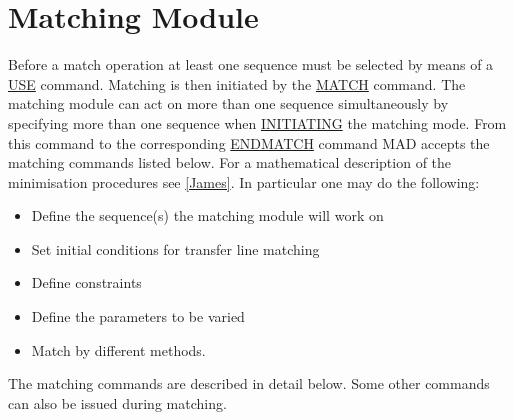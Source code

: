  
\chapter{Matching Module}
\label{chap:match}

Before a match operation at least one sequence must be selected by means
of a \href{../control/general.html#use}{USE} command. Matching is then
initiated by the \href{match_main.html}{MATCH} command. The matching
module can act on more than one sequence simultaneously by  specifying
more than one sequence when  \href{match_main.html#match}{INITIATING}
the matching mode.  From this command to the corresponding
\href{match_main.html#endmatch}{ENDMATCH} command MAD accepts the
matching commands listed below. For a mathematical description of the
minimisation procedures see \href{bibliography.html#minuit}{[James]}. In
particular one may do the following: 
\begin{itemize}
	\item Define the sequence(s) the matching module will work on 
	\item Set initial conditions for transfer line matching 
	\item Define constraints 
	\item Define the parameters to be varied 
	\item Match by different methods. 
\end{itemize}

The matching commands are described in detail below. Some other commands
can also be issued during matching.  


